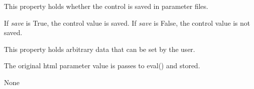 \documentclass[letterpaper,10pt,english]{sphinxmanual}
\begin{document}
\begin{fulllineitems}
\begin{fulllineitems}
\end{fulllineitems}


\begin{fulllineitems}
\label{api:controls.FilePicker.save}
This property holds whether the control is saved in parameter files.

If \emph{save} is True, the control value is saved.
If \emph{save} is False, the control value is not saved.

\end{fulllineitems}


\begin{fulllineitems}
\label{api:controls.FilePicker.user}
This property holds arbitrary data that can be set by the user.

The original html parameter value is passes to eval() and stored.

\end{fulllineitems}


\begin{fulllineitems}
\label{api:controls.FilePicker.value}
None

\end{fulllineitems}


\end{fulllineitems}

\end{document}
